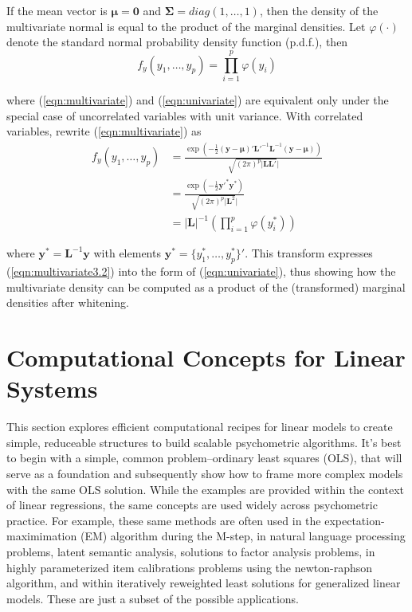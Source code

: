 \documentclass[12pt]{article}
\begin{document}
\noindent If the mean vector is $\bm{\mu} = \bm{0}$ and $\bm{\Sigma} = diag(1, \ldots, 1)$, then the density of the multivariate normal is equal to the product of the marginal densities. Let $\varphi(\cdot)$ denote the standard normal probability density function (p.d.f.), then
\begin{equation}
\label{eqn:univariate}
f_y(y_1, \ldots, y_p)  =  \prod_{i=1}^p\varphi(y_i)
\end{equation}

\noindent where (\ref{eqn:multivariate}) and (\ref{eqn:univariate}) are equivalent only under the special case of uncorrelated variables with unit variance. With correlated variables, rewrite (\ref{eqn:multivariate}) as
\begin{align}
\label{eqn:multivariate2}
f_y(y_1, \ldots, y_p)  & =  \frac{\exp(-\frac{1}{2}(\bm{y} - \bm{\mu})'\bm{L}'^{-1}\bm{L}^{-1}(\bm{y} - \bm{\mu}))}{\sqrt{(2\pi)^p|\bm{L}\bm{L}'}|}\\
				&=  \frac{\exp(-\frac{1}{2}\bm{y}'^{*}\bm{y}^{*}  )}{\sqrt{(2\pi)^p|\bm{L}^2}|} \label{eqn:multivariate3.1}\\
				& =  |\bm{L}|^{-1}\left(\prod_{i=1}^p\varphi(y^*_i)\right) \label{eqn:multivariate3.2}
\end{align}

\noindent where $\bm{y}^* = \bm{L}^{-1}\bm{y}$ with elements $\bm{y}^{*} = \{y_1^*, \ldots, y_p^*\}'$. This transform expresses (\ref{eqn:multivariate3.2}) into the form of (\ref{eqn:univariate}), thus showing how the multivariate density can be computed as a product of the (transformed) marginal densities after whitening.

\section*{Computational Concepts for Linear Systems}

This section explores efficient computational recipes for linear models to create simple, reduceable structures to build scalable psychometric algorithms. It's best to begin with a simple, common problem--ordinary least squares (OLS), that will serve as a foundation and subsequently show how to frame more complex models with the same OLS solution. While the examples are provided within the context of linear regressions, the same concepts are used widely across psychometric practice. For example, these same methods are often used in the expectation-maximimation (EM) algorithm during the M-step, in natural language processing problems, latent semantic analysis, solutions to factor analysis problems, in highly parameterized item calibrations problems using the newton-raphson algorithm, and within iteratively reweighted least solutions for generalized linear models. These are just a subset of the possible applications.  
\end{document}
